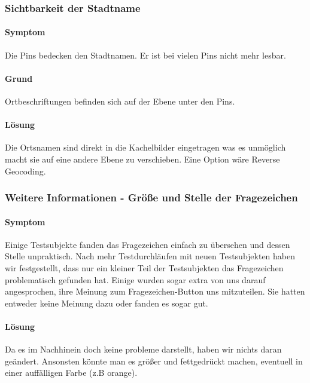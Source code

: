\subsubsection{Sichtbarkeit der Stadtname}
\paragraph{Symptom}
Die Pins bedecken den Stadtnamen. Er ist bei vielen Pins nicht mehr lesbar.

\paragraph{Grund}
Ortbeschriftungen befinden sich auf der Ebene unter den Pins. 

\paragraph{Lösung}
Die Ortsnamen sind direkt in die Kachelbilder eingetragen was es unmöglich macht sie 
auf eine andere Ebene zu verschieben. Eine Option wäre Reverse Geocoding.

\subsubsection{Weitere Informationen - Größe und Stelle der Fragezeichen}

\paragraph{Symptom}
Einige Testsubjekte fanden das Fragezeichen einfach zu übersehen und dessen Stelle unpraktisch. Nach mehr Testdurchläufen mit neuen Testsubjekten haben wir festgestellt, dass nur ein kleiner Teil der Testsubjekten das Fragezeichen problematisch gefunden hat. Einige wurden sogar extra von uns darauf angesprochen, ihre Meinung zum Fragezeichen-Button uns mitzuteilen. Sie hatten entweder keine Meinung dazu oder fanden es sogar gut.

\paragraph{Lösung}
Da es im Nachhinein doch keine probleme darstellt, haben wir nichts daran geändert. Ansonsten könnte man es größer und fettgedrückt machen, eventuell in einer auffälligen Farbe (z.B orange).